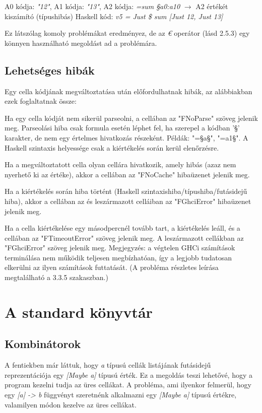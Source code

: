 A0 kódja: \textit{"12"}, A1 kódja: \textit{"13"}, A2 kódja: \textit{=sum §a0:a10} $\rightarrow$ A2 értékét kiszámító (típushibás) Haskell kód: \textit{v5 = Just \$ sum [Just 12, Just 13]}

Ez látszólag komoly problémákat eredményez, de az \textit{€} operátor (lásd 2.5.3) egy könnyen használható megoldást ad a problémára.

\subsection{Lehetséges hibák}

Egy cella kódjának megváltoztatása után előfordulhatnak hibák, az alábbiakban ezek foglaltatnak össze:
\begin{compactenum}
	\item Ha egy cella kódját nem sikerül parseolni, a cellában az "FNoParse" szöveg jelenik meg. Parseolási hiba csak formula esetén léphet fel, ha szerepel a kódban '§' karakter, de nem egy értelmes hivatkozás részeként. Példák: "=§a§", "=a1§". A Haskell szintaxis helyessége csak a kiértékelés során kerül elenőrzésre.
	\item Ha a megváltoztatott cella olyan cellára hivatkozik, amely hibás (azaz nem nyerhető ki az értéke), akkor a cellában az "FNoCache" hibaüzenet jelenik meg. 
	\item Ha a kiértékelés során hiba történt (Haskell szintaxishiba/típushiba/futásidejű hiba), akkor a cellában az és leszármazott celláiban az "FGhciError" hibaüzenet jelenik meg.
	\item Ha a cella kiértékelése egy másodpercnél tovább tart, a kiértékelés leáll, és a cellában az "FTimeoutError" szöveg jelenik meg. A leszármazott cellákban az "FGhciError" szöveg jelenik meg. Megjegyzés: a végtelen GHCi számítások terminálása nem működik teljesen megbízhatóan, így a legjobb tudatosan elkerülni az ilyen számítások futtatását. (A probléma részletes leírása megtalálható a 3.3.5 szakaszban.)
\end{compactenum}

\section{A standard könyvtár}

\subsection{Kombinátorok}

A fentiekben már láttuk, hogy \textit{a} típusú cellák listájának futásidejű reprezentációja egy \textit{[Maybe a]} típusú érték. Ez a megoldás teszi lehetővé, hogy a program kezelni tudja az üres cellákat. A probléma, ami ilyenkor felmerül, hogy egy \textit{[a] -> b} függvényt szeretnénk alkalmazni egy \textit{[Maybe a]} típusú értékre, valamilyen módon kezelve az üres cellákat.

